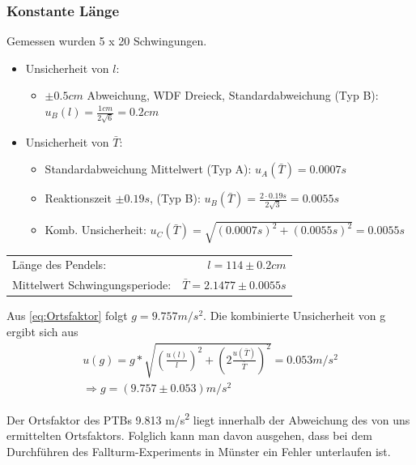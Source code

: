 \documentclass[
	a4paper,
	12pt,
	pagesize,
	ngerman
]{scrartcl}
\begin{document}
	\subsubsection{Konstante Länge}
	Gemessen wurden 5 x 20 Schwingungen.
	\begin{itemize}
		\item Unsicherheit von \(l\): 
			\begin{itemize}
				\item $\pm0.5\si{cm}$ Abweichung, WDF Dreieck, Standardabweichung (Typ B): \( u_B(l) = \frac{1\si{cm}}{2\sqrt{6}} = 0.2\si{cm} \)
			\end{itemize}

		\item Unsicherheit von \(\bar{T}\): 
			\begin{itemize}
				\item Standardabweichung Mittelwert (Typ A): \( u_A(\bar{T}) = 0.0007\si{s} \)
				\item Reaktionszeit  $\pm0.19 \si{s}$, (Typ B): \( u_B(\bar{T}) = \frac{2\cdot0.19\si{s}}{2\sqrt{3}} = 0.0055\si{s} \)
				\item Komb. Unsicherheit: $ u_C(\bar{T}) = \sqrt{(0.0007\si{s})^2+(0.0055\si{s})^2} = 0.0055 \si{s} $
			\end{itemize}
	\end{itemize}

	\begin{tabular}{l r}
		Länge des Pendels: & \(l = 114 \pm 0.2\si{cm} \) \\
		Mittelwert Schwingungsperiode: & \(\bar{T} = 2.1477 \pm 0.0055\si{s} \) \\
	\end{tabular} 
	

	\par

	\noindent Aus \eqref{eq:Ortsfaktor} folgt $ g = 9.757  \si{m/s^2}$. Die kombinierte Unsicherheit von g ergibt sich aus
	\begin{align*}
		u(g) = g * \sqrt{\left(\frac{u(l)}{l}\right)^2 + \left(2\frac{u(\bar{T})}{\bar{T}}\right)^2} = 0.053 \si{m/s^2} \\
		\Rightarrow{} g = (9.757 \pm 0.053) \si{m/s^2}
	\end{align*}

	Der Ortsfaktor des PTBs 9.813 \si{m/s^2} liegt innerhalb der Abweichung des von uns ermittelten Ortsfaktors. Folglich kann man davon ausgehen, dass bei dem Durchführen des Fallturm-Experiments in Münster ein Fehler unterlaufen ist.
\end{document}
